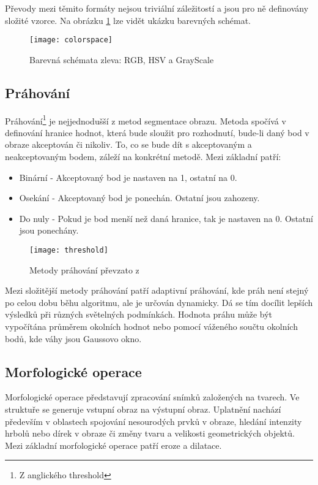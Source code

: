 Převody mezi těmito formáty nejsou triviální záležitostí a jsou pro ně definovány složité vzorce. Na obrázku \ref{fig:colorspace} lze vidět ukázku barevných schémat. 

\begin{figure}[h]
	\texttt{[image: colorspace]}
	\centering
	\caption{Barevná schémata zleva: RGB, HSV a GrayScale}\label{fig:colorspace}
\end{figure}

\subsection{Práhování}
Práhování\footnote{Z anglického threshold} je nejjednodušší z metod segmentace obrazu. Metoda spočívá v definování hranice hodnot, která bude sloužit pro rozhodnutí, bude-li daný bod v obraze  akceptován či nikoliv. To, co se bude dít s akceptovaným a neakceptovaným bodem, záleží na konkrétní metodě. Mezi základní patří:\cite{opencv}

\begin{itemize}
	\item Binární - Akceptovaný bod je nastaven na 1, ostatní na 0.
	\item Osekání - Akceptovaný bod je ponechán. Ostatní jsou zahozeny.
	\item Do nuly - Pokud je bod menší než daná hranice, tak je nastaven na 0. Ostatní jsou ponechány.
\end{itemize}

\begin{figure}[h]
	\texttt{[image: threshold]}
	\centering
	\caption{Metody práhování převzato z \cite{opencv}}\label{fig:threshold}
\end{figure}

Mezi složitější metody práhování patří adaptivní práhování, kde práh není stejný po celou dobu běhu algoritmu, ale je určován dynamicky. Dá se tím docílit lepších výsledků  při různých světelných podmínkách. Hodnota práhu může být vypočítána průměrem okolních hodnot nebo pomocí váženého součtu okolních bodů, kde váhy jsou Gaussovo okno.\cite{opencv}

\subsection{Morfologické operace}
Morfologické operace představují zpracování snímků založených na tvarech. Ve struktuře se generuje vstupní obraz na výstupní obraz. Uplatnění nachází především v oblastech spojování nesourodých prvků v obraze, hledání intenzity hrbolů nebo dírek v obraze či změny tvaru a velikosti geometrických objektů. Mezi základní morfologické operace patří eroze a dilatace.\cite{eroding}

